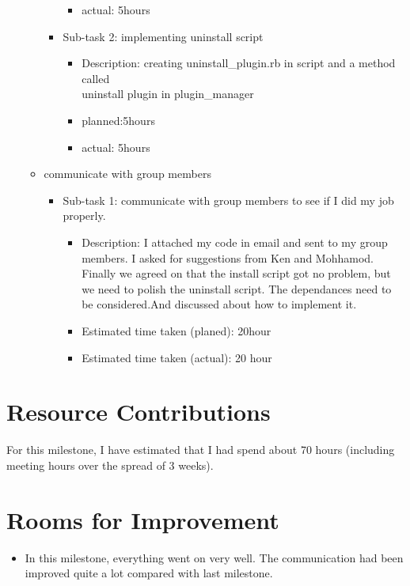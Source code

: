 \documentclass{article}
\begin{document}
\begin{itemize}
\begin{itemize}
\begin{itemize}
\begin{itemize}
                            \item actual: 5hours
                        \end{itemize}
                    \item Sub-task 2: implementing uninstall script\\
                        \begin{itemize}
                            \item Description: creating uninstall\_plugin.rb in script and a method called\\ 
                            uninstall plugin in plugin\_manager\\
                            \item planned:5hours
                            \item actual: 5hours
                        \end{itemize}
                \end{itemize}
            \item communicate with group members 
                \begin{itemize}
                    \item Sub-task 1: communicate with group members to see if I did my job properly.
                        \begin{itemize}
                            \item Description: I attached my code in email and sent to my group members. I asked for suggestions from Ken and Mohhamod. Finally we agreed on that the install script got no problem, but we need to polish the uninstall script. The dependances need to be considered.And discussed about how to implement it.
                            \item Estimated time taken (planed): 20hour
                            \item Estimated time taken (actual): 20 hour
                        \end{itemize}
                \end{itemize}
        \end{itemize}
\end{itemize}

\section*{Resource Contributions}

For this milestone, I have estimated that I had spend about 70 hours (including  meeting hours over the spread of 3 weeks).

\section*{Rooms for Improvement}

\begin{itemize}
   \item In this milestone, everything went on very well. The communication had been improved quite a lot compared with last milestone.
\end{itemize}
\end{document}
